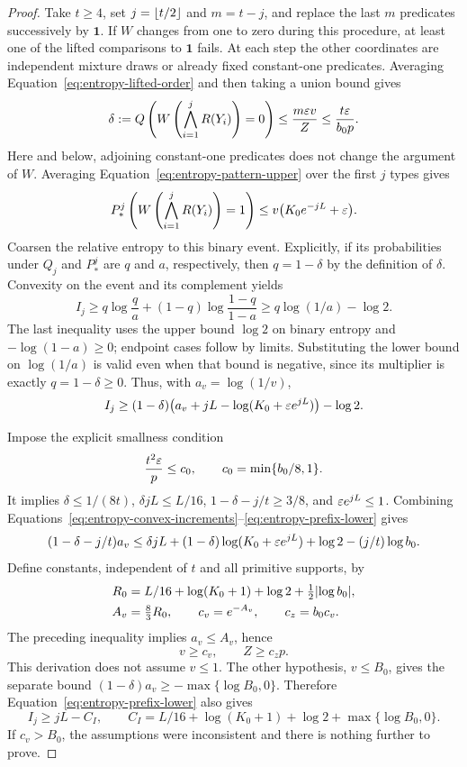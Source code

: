 \begin{proof}
Take $t\ge4$, set $j=\lfloor t/2\rfloor$ and $m=t-j$, and replace the last
$m$ predicates successively by $\mathbf1$.  If $W$ changes from one to
zero during this procedure, at least one of the lifted comparisons to
$\mathbf1$ fails.  At each step the other coordinates are independent
mixture draws or already fixed constant-one predicates.  Averaging
Equation~\ref{eq:entropy-lifted-order} and then taking a union bound gives
\[
 \delta:=Q\left(W\left(\bigwedge_{i=1}^jR(Y_i)\right)=0\right)
 \le \frac{m\varepsilon v}{Z}
 \le\frac{t\varepsilon}{b_0p}.
\]
Here and below, adjoining constant-one predicates does not change the
argument of $W$.  Averaging Equation~\ref{eq:entropy-pattern-upper} over
the first $j$ types gives
\[
 P_*^j\left(W\left(\bigwedge_{i=1}^jR(Y_i)\right)=1\right)
 \le v\bigl(K_0e^{-jL}+\varepsilon\bigr).
\]
Coarsen the relative entropy to this binary event.  Explicitly, if its
probabilities under $Q_j$ and $P_*^j$ are $q$ and $a$, respectively,
then $q=1-\delta$ by the definition of $\delta$. Convexity on the event
and its complement yields
\[
 I_j\ge q\log\frac qa+(1-q)\log\frac{1-q}{1-a}
       \ge q\log(1/a)-\log2.
\]
The last inequality uses the upper bound $\log2$ on binary entropy and
$-\log(1-a)\ge0$; endpoint cases follow by limits. Substituting the
lower bound on $\log(1/a)$ is valid even when that bound is negative,
since its multiplier is exactly $q=1-\delta\ge0$. Thus, with
$a_v=\log(1/v)$,
\begin{equation}
 \label{eq:entropy-prefix-lower}
 I_j\ge(1-\delta)
       \bigl(a_v+jL-\log(K_0+\varepsilon e^{jL})\bigr)-\log2.
\end{equation}

Impose the explicit smallness condition
\begin{equation}
 \label{eq:entropy-epsilon-small}
 \frac{t^2\varepsilon}{p}\le c_0,
 \qquad c_0=\min\{b_0/8,1\}.
\end{equation}
It implies $\delta\le1/(8t)$, $\delta jL\le L/16$,
$1-\delta-j/t\ge3/8$, and $\varepsilon e^{jL}\le1$.  Combining
Equations~\ref{eq:entropy-convex-increments}--\ref{eq:entropy-prefix-lower}
gives
\[
 (1-\delta-j/t)a_v
 \le\delta jL+(1-\delta)\log(K_0+\varepsilon e^{jL})
       +\log2-(j/t)\log b_0.
\]
Define constants, independent of $t$ and all primitive supports, by
\begin{align*}
 R_0&=L/16+\log(K_0+1)+\log2+\tfrac12\lvert\log b_0\rvert,\\
 A_v&=\tfrac83 R_0,\qquad c_v=e^{-A_v},\qquad c_z=b_0c_v.
\end{align*}
The preceding inequality implies $a_v\le A_v$, hence
\begin{equation}
 \label{eq:entropy-normalization-lower}
 v\ge c_v,\qquad Z\ge c_zp.
\end{equation}
This derivation does not assume $v\le1$.  The other hypothesis,
$v\le B_0$, gives the separate bound
$(1-\delta)a_v\ge-\max\{\log B_0,0\}$.  Therefore
Equation~\ref{eq:entropy-prefix-lower} also gives
\begin{equation}
 \label{eq:entropy-prefix-rate}
 I_j\ge jL-C_I,
 \qquad
 C_I=L/16+\log(K_0+1)+\log2+\max\{\log B_0,0\}.
\end{equation}
If $c_v>B_0$, the assumptions were inconsistent and there is nothing
further to prove.


\end{proof}
